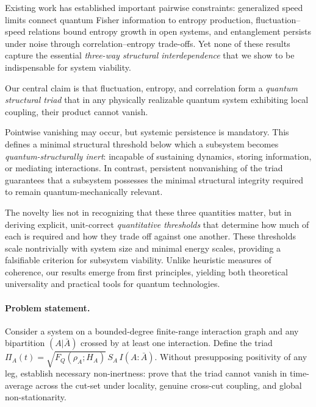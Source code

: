 \documentclass[10pt]{article}
\begin{document}
Existing work has established important pairwise constraints:
generalized speed limits connect quantum Fisher information to entropy production\cite{DeffnerLutz2013,NishiyamaHasegawa2024},
fluctuation--speed relations bound entropy growth in open systems\cite{Hamazaki2024,ShiraishiSaito2018},
and entanglement persists under noise through correlation–entropy trade-offs\cite{Benedetti2012,BenattiFloreanini2005}.
Yet none of these results capture the essential \emph{three-way structural interdependence}
that we show to be indispensable for system viability.

Our central claim is that fluctuation, entropy, and correlation form a \emph{quantum structural triad}
that in any physically realizable quantum system exhibiting local coupling, their product cannot vanish.

Pointwise vanishing may occur, but systemic persistence is mandatory.
This defines a minimal structural threshold below which a subsystem becomes
\emph{quantum-structurally inert}\cite{DeffnerCampbell2017,NishiyamaHasegawa2025}:
incapable of sustaining dynamics, storing information, or mediating interactions.
In contrast, persistent nonvanishing of the triad guarantees that a subsystem
possesses the minimal structural integrity required to remain quantum-mechanically relevant.

The novelty lies not in recognizing that these three quantities matter,
but in deriving explicit, unit-correct \emph{quantitative thresholds}
that determine how much of each is required and how they trade off against one another.
These thresholds scale nontrivially with system size and minimal energy scales\cite{MargolusLevitin1998,Kliesch2014},
providing a falsifiable criterion for subsystem viability.
Unlike heuristic measures of coherence, our results emerge from first principles,
yielding both theoretical universality and practical tools for quantum technologies.


\paragraph{Problem statement.}
Consider a system on a bounded-degree finite-range interaction graph and any bipartition $(A|\bar A)$ crossed by at least one interaction. Define the triad $\Pi_A(t)=\sqrt{F_Q(\rho_A;H_A)}\,S_A\,I(A{:}\bar A)$. Without presupposing positivity of any leg, establish necessary non-inertness:
prove that the triad cannot vanish in time-average across the cut-set under locality, genuine cross-cut coupling, and global non-stationarity. \cite{NachtergaeleSims2010,NielsenChuang2010,BraunsteinCaves1994}
\end{document}
